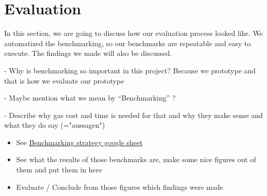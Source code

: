 \section{Evaluation}
In this section, we are going to discuss how our evaluation process looked like. We automatized the benchmarking, so our benchmarks are repeatable and easy to execute. The findings we made will also be discussed.

- Why is benchmarking so important in this project? Because we prototype and that is how we evaluate our prototype

- Maybe mention what we mean by ``Benchmarking'' ?

- Describe why gas cost and time is needed for that and why they make sense and what they do say (="aussagen")

\begin{itemize}
\item See \href{https://drive.google.com/drive/folders/1KhEb6TT2YXKUlSJx2sdfR44ZhWUSHnXN}{Benchmarking strategy google sheet}
\item See what the results of those benchmarks are, make some nice figures out of them and put them in here
\item Evaluate / Conclude from those figures which findings were made
\end{itemize}





\newpage
